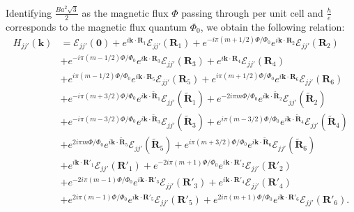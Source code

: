 \documentclass{report}
\begin{document}
Identifying $\frac{B a^{2} \sqrt{3}}{2}$ as the magnetic flux $\Phi$ passing through per unit cell and $\frac{h}{e}$ corresponds to the magnetic flux quantum $\Phi_{0}$, we obtain the following relation:
\begin{equation}
	\begin{aligned}
		H_{jj'}(\mathbf{k})
		 & = \mathcal{E}_{jj'}(\mathbf{0}) + e^{i \mathbf{k} \cdot \mathbf{R}_{1}} \mathcal{E}_{jj'}(\mathbf{R}_{1}) + e^{-i\pi(m + 1/2)\Phi / \Phi_{0}} e^{i \mathbf{k} \cdot \mathbf{R}_{2}} \mathcal{E}_{jj'}(\mathbf{R}_{2})  \\
		 & + e^{-i\pi(m - 1/2)\Phi / \Phi_{0}} e^{i \mathbf{k} \cdot \mathbf{R}_{3}} \mathcal{E}_{jj'}(\mathbf{R}_{3}) + e^{i \mathbf{k} \cdot \mathbf{R}_{4}} \mathcal{E}_{jj'}(\mathbf{R}_{4})                                  \\
		 & + e^{i\pi(m - 1/2)\Phi / \Phi_{0}} e^{i \mathbf{k} \cdot \mathbf{R}_{5}} \mathcal{E}_{jj'}(\mathbf{R}_{5}) + e^{i\pi(m + 1/2)\Phi / \Phi_{0}} e^{i \mathbf{k} \cdot \mathbf{R}_{6}} \mathcal{E}_{jj'}(\mathbf{R}_{6}) \\
		 & + e^{- i\pi(m + 3/2)\Phi/\Phi_{0} } e^{i \mathbf{k} \cdot \tilde{\mathbf{R}}_{1}} \mathcal{E}_{jj'}(\tilde{\mathbf{R}}_{1}) + e^{- 2i\pi m\Phi/\Phi_{0} } e^{i \mathbf{k} \cdot \tilde{\mathbf{R}}_{2}} \mathcal{E}_{jj'}(\tilde{\mathbf{R}}_{2}) \\
		 & + e^{- i\pi(m - 3/2)\Phi/\Phi_{0} } e^{i \mathbf{k} \cdot \tilde{\mathbf{R}}_{3}} \mathcal{E}_{jj'}(\tilde{\mathbf{R}}_{3}) + e^{ i\pi (m-3/2)\Phi/\Phi_{0} } e^{i \mathbf{k} \cdot \tilde{\mathbf{R}}_{4}} \mathcal{E}_{jj'}(\tilde{\mathbf{R}}_{4}) \\
		 & + e^{2 i\pi m \Phi/\Phi_{0} } e^{i \mathbf{k} \cdot \tilde{\mathbf{R}}_{5}} \mathcal{E}_{jj'}(\tilde{\mathbf{R}}_{5}) + e^{ i\pi (m+3/2)\Phi/\Phi_{0} } e^{i \mathbf{k} \cdot \tilde{\mathbf{R}}_{6}} \mathcal{E}_{jj'}(\tilde{\mathbf{R}}_{6}) \\
		 & + e^{i \mathbf{k} \cdot \mathbf{R}'_{1}} \mathcal{E}_{jj'}(\mathbf{R}'_{1}) + e^{-2i\pi(m + 1)\Phi / \Phi_{0}} e^{i \mathbf{k} \cdot \mathbf{R}'_{2}} \mathcal{E}_{jj'}(\mathbf{R}'_{2})  \\
		 & + e^{-2i\pi(m - 1)\Phi / \Phi_{0}} e^{i \mathbf{k} \cdot \mathbf{R}'_{3}} \mathcal{E}_{jj'}(\mathbf{R}'_{3}) + e^{i \mathbf{k} \cdot \mathbf{R}'_{4}} \mathcal{E}_{jj'}(\mathbf{R}'_{4})                                  \\
		 & + e^{2i\pi(m - 1)\Phi / \Phi_{0}} e^{i \mathbf{k} \cdot \mathbf{R}'_{5}} \mathcal{E}_{jj'}(\mathbf{R}'_{5}) + e^{2i\pi(m + 1)\Phi / \Phi_{0}} e^{i \mathbf{k} \cdot \mathbf{R}'_{6}} \mathcal{E}_{jj'}(\mathbf{R}'_{6}).
	\end{aligned}
\end{equation}
\end{document}
